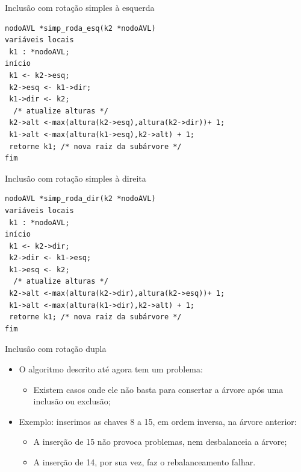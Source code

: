 \documentclass[12pt,table,xcolor={dvipsnames}]{beamer}
\begin{document}
\begin{frame}[fragile]{Inclusão com rotação simples à esquerda}
\begin{lstlisting}
nodoAVL *simp_roda_esq(k2 *nodoAVL)
variáveis locais
 k1 : *nodoAVL;
início
 k1 <- k2->esq;
 k2->esq <- k1->dir;
 k1->dir <- k2;
  /* atualize alturas */
 k2->alt <-max(altura(k2->esq),altura(k2->dir))+ 1;
 k1->alt <-max(altura(k1->esq),k2->alt) + 1;     
 retorne k1; /* nova raiz da subárvore */
fim
\end{lstlisting}
\end{frame}

\begin{frame}[fragile]{Inclusão com rotação simples à direita}
\begin{lstlisting}
nodoAVL *simp_roda_dir(k2 *nodoAVL)
variáveis locais
 k1 : *nodoAVL;
início
 k1 <- k2->dir;
 k2->dir <- k1->esq;
 k1->esq <- k2;
  /* atualize alturas */
 k2->alt <-max(altura(k2->dir),altura(k2->esq))+ 1;
 k1->alt <-max(altura(k1->dir),k2->alt) + 1;     
 retorne k1; /* nova raiz da subárvore */
fim
\end{lstlisting}
\end{frame}

\begin{frame}[fragile]{Inclusão com rotação dupla}
\begin{itemize}
\item O algoritmo descrito até agora tem um problema:
\begin{itemize}
\item Existem casos onde ele não basta para consertar a árvore após uma inclusão ou exclusão;
\end{itemize}
\item Exemplo: inserimos as chaves 8 a 15, em ordem inversa, na árvore anterior:
\begin{itemize}
\item A inserção de 15 não provoca problemas, nem desbalanceia a árvore;
\item A inserção de 14, por sua vez, faz o rebalanceamento falhar.
\end{itemize}
\end{itemize}
\end{frame}
\end{document}
